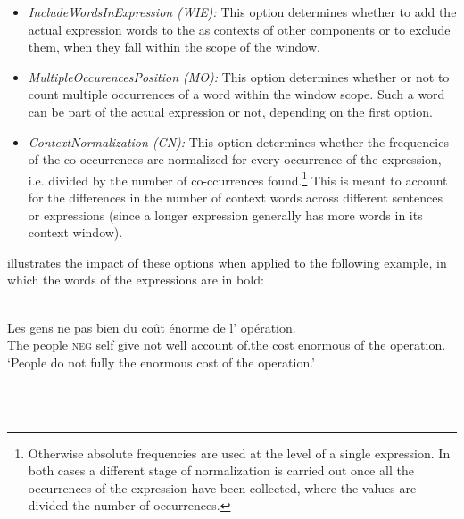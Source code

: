 \documentclass[output=paper
,modfonts
,nonflat]{langsci/langscibook}
\begin{document}
\begin{itemize}

\item {\em IncludeWordsInExpression (WIE):} This option determines
  whether to add the actual expression words to the  as
  contexts of other components or to exclude them, when they fall
  within the scope of the window.


\item {\em MultipleOccurencesPosition (MO):} This option determines whether
  or not to count multiple occurrences of a word within the window
  scope. Such a word can be part of the actual expression or not,
  depending on the first option.


\item {\em ContextNormalization (CN):} This option determines whether the
  frequencies of the co-occurrences are normalized for every
  occurrence of the expression, i.e. divided by the number of
  co-ccurrences found.\footnote{Otherwise absolute frequencies are
    used at the level of a single expression. In both cases a
    different stage of normalization is carried out once all the
    occurrences of the expression have been collected, where the
    values are divided the number of occurrences.} This is meant to
  account for the differences in the number of context words across
  different sentences or expressions (since a longer expression
  generally has more words in its context window).
\end{itemize}


 illustrates the impact of these options when applied to the following example, in which the words of the expressions are in bold:

\vspace*{.2cm}

\begin{minipage}{\linewidth}
\ea 
{}\\
\gll Les gens ne   pas bien  du coût énorme de l' opération.\\
     The people \textsc{neg}  self give          not well account of.the cost enormous of the operation.\\

\glt `People do not fully  the enormous cost of the operation.'\\
\z
\end{minipage}\\
\\
\end{document}
